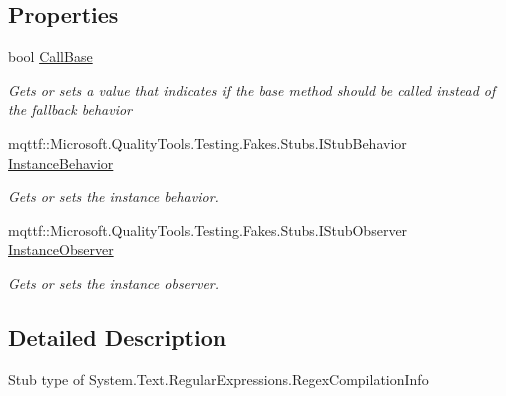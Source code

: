 \subsection*{Properties}
\begin{DoxyCompactItemize}
\item 
bool \hyperlink{class_system_1_1_text_1_1_regular_expressions_1_1_fakes_1_1_stub_regex_compilation_info_a71fe31c758fa438d43cd4b3310c194aa}{Call\-Base}
\begin{DoxyCompactList}\small\item\em Gets or sets a value that indicates if the base method should be called instead of the fallback behavior\end{DoxyCompactList}\item 
mqttf\-::\-Microsoft.\-Quality\-Tools.\-Testing.\-Fakes.\-Stubs.\-I\-Stub\-Behavior \hyperlink{class_system_1_1_text_1_1_regular_expressions_1_1_fakes_1_1_stub_regex_compilation_info_aac761da273158188876a129eef588fa7}{Instance\-Behavior}
\begin{DoxyCompactList}\small\item\em Gets or sets the instance behavior.\end{DoxyCompactList}\item 
mqttf\-::\-Microsoft.\-Quality\-Tools.\-Testing.\-Fakes.\-Stubs.\-I\-Stub\-Observer \hyperlink{class_system_1_1_text_1_1_regular_expressions_1_1_fakes_1_1_stub_regex_compilation_info_a4681a1b438c09a45ef16326e7c9cc158}{Instance\-Observer}
\begin{DoxyCompactList}\small\item\em Gets or sets the instance observer.\end{DoxyCompactList}\end{DoxyCompactItemize}


\subsection{Detailed Description}
Stub type of System.\-Text.\-Regular\-Expressions.\-Regex\-Compilation\-Info



